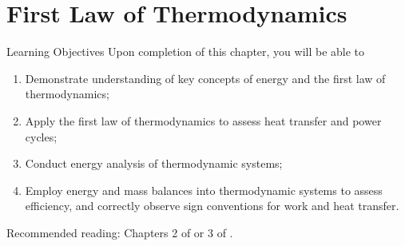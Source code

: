 
\chapter{First Law of Thermodynamics}\label{Chapter:FirstLaw}

   \begin{LearningObjectivesBlock}{Learning Objectives}
      Upon completion of this chapter, you will be able to
        \begin{enumerate}
           \item Demonstrate understanding of key concepts of energy and the first law of thermodynamics;
           \item Apply the first law of thermodynamics to assess heat transfer and power cycles;
           \item Conduct energy analysis of thermodynamic systems;
           \item Employ energy and mass balances into thermodynamic systems to assess efficiency, and correctly observe sign conventions for work and heat transfer.
        \end{enumerate}
\medskip
     Recommended reading: Chapters 2 of \citet{Atkins_Book,SmithVanNess_Book,Moran_Book} or 3 of \citet{Borgnakke_Book}.
   \end{LearningObjectivesBlock}

